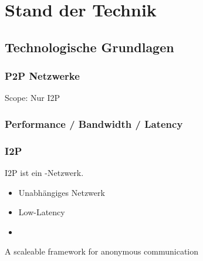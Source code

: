 \chapter{Stand der Technik}
\label{ch:StandDerTechnik}



\section{Technologische Grundlagen}

\subsection{P2P Netzwerke}

Scope: Nur I2P

\subsection{Performance / Bandwidth / Latency}

\subsection{I2P}

I2P ist ein -Netzwerk.

\begin{itemize}
    \item Unabhängiges Netzwerk
    \item Low-Latency
    \item {}
\end{itemize}

\cite{astolfi_i2p_2015}
\cite{astolfi_i2p_nodate}

\cite{timpanaro_birds_2012}

\cite{timpanaro_evaluation_2015}

A scaleable framework for anonymous communication
\cite{noauthor_i2p_nodate-8}


